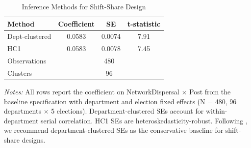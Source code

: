 \begin{table}[htbp]
\centering
\caption{Inference Methods for Shift-Share Design}
\label{tab:inference}
\begin{tabular}{lccc}
\toprule
Method & Coefficient & SE & t-statistic \\
\midrule
Dept-clustered & 0.0583 & 0.0074 & 7.91 \\
HC1 & 0.0583 & 0.0078 & 7.45 \\
\midrule
Observations & \multicolumn{3}{c}{480} \\
Clusters & \multicolumn{3}{c}{96} \\
\bottomrule
\end{tabular}
\begin{minipage}{0.95\textwidth}
\small\textit{Notes:} All rows report the coefficient on NetworkDispersal $\times$ Post from the baseline specification with department and election fixed effects (N = 480, 96 departments $\times$ 5 elections). Department-clustered SEs account for within-department serial correlation. HC1 SEs are heteroskedasticity-robust. Following \citet{adao2019shift}, we recommend department-clustered SEs as the conservative baseline for shift-share designs.
\end{minipage}
\end{table}
